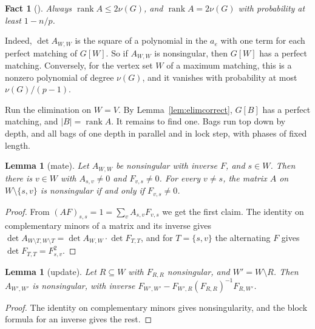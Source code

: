 \documentclass[11pt]{article}
\newtheorem{lemma}[theorem]{Lemma}
\newtheorem{fact}[theorem]{Fact}
\theoremstyle{definition}
\theoremstyle{remark}
\theoremstyle{plain}
\newcommand{\rank}{\operatorname{rank}}
\begin{document}
\begin{fact}[\cite{RV89}]\label{fact:tutte}
Always $\rank A\le2\nu(G)$, and $\rank A=2\nu(G)$ with probability at least $1-n/p$.
\end{fact}
Indeed, $\det A_{W,W}$ is the square of a polynomial in the $a_e$ with one term for each perfect matching of $G[W]$. So if $A_{W,W}$ is nonsingular, then $G[W]$ has a perfect matching. Conversely, for the vertex set $W$ of a
maximum matching, this is a nonzero polynomial of degree $\nu(G)$, and it vanishes with probability at most $\nu(G)/(p-1)$.

Run the elimination on $W=V$. By Lemma~\ref{lem:elimcorrect}, $G[B]$ has a perfect matching, and $|B|=\rank A$. It remains to find one. Bags run top down by depth, and all
bags of one depth in parallel and in lock step, with phases of fixed length.

\begin{lemma}[mate]\label{lem:mate}
Let $A_{W,W}$ be nonsingular with inverse $F$, and $s\in W$. Then there is $v\in W$ with $A_{s,v}\ne0$ and $F_{v,s}\ne0$. For every $v\ne s$, the matrix $A$ on
$W\setminus\{s,v\}$ is nonsingular if and only if $F_{v,s}\ne0$.
\end{lemma}
\begin{proof}
From $(AF)_{s,s}=1=\sum_vA_{s,v}F_{v,s}$ we get the first claim. The identity on complementary minors of a matrix and its inverse gives $\det A_{W\setminus T,W\setminus T}=\det A_{W,W}\cdot\det F_{T,T}$,
and for $T=\{s,v\}$ the alternating $F$ gives $\det F_{T,T}=F_{s,v}^2$.
\end{proof}

\begin{lemma}[update]\label{lem:update}
Let $R\subseteq W$ with $F_{R,R}$ nonsingular, and $W'=W\setminus R$. Then $A_{W',W'}$ is nonsingular, with inverse $F_{W',W'}-F_{W',R}(F_{R,R})^{-1}F_{R,W'}$.
\end{lemma}
\begin{proof}
The identity on complementary minors gives nonsingularity, and the block formula for an inverse gives the rest.
\end{proof}
\end{document}
